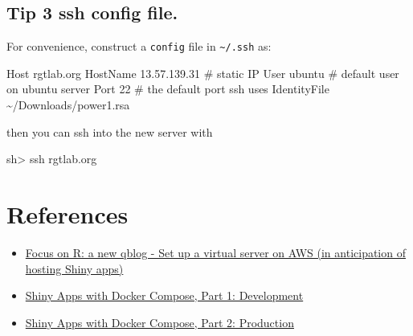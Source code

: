 \documentclass[
  letterpaper,
  DIV=11,
  numbers=noendperiod,
  oneside]{scrartcl}
\newenvironment{Shaded}{\begin{snugshade}}{\end{snugshade}}
\newcommand{\AttributeTok}[1]{\textcolor[rgb]{0.40,0.45,0.13}{#1}}
\newcommand{\CommentTok}[1]{\textcolor[rgb]{0.37,0.37,0.37}{#1}}
\newcommand{\ExtensionTok}[1]{\textcolor[rgb]{0.00,0.23,0.31}{#1}}
\newcommand{\FunctionTok}[1]{\textcolor[rgb]{0.28,0.35,0.67}{#1}}
\newcommand{\NormalTok}[1]{\textcolor[rgb]{0.00,0.23,0.31}{#1}}
\newcommand{\OperatorTok}[1]{\textcolor[rgb]{0.37,0.37,0.37}{#1}}
\newcommand{\VariableTok}[1]{\textcolor[rgb]{0.07,0.07,0.07}{#1}}
\providecommand{\tightlist}{%
  \setlength{\itemsep}{0pt}\setlength{\parskip}{0pt}}\usepackage{longtable,booktabs,array}
\begin{document}
\begin{Shaded}
\end{Shaded}

\hypertarget{tip-3-ssh-config-file.}{%
\subsection{Tip 3 ssh config file.}\label{tip-3-ssh-config-file.}}

For convenience, construct a \texttt{config} file in
\texttt{\textasciitilde{}/.ssh} as:

\begin{Shaded}
\begin{Highlighting}[]
\ExtensionTok{Host}\NormalTok{ rgtlab.org}
\ExtensionTok{HostName}\NormalTok{ 13.57.139.31 }\CommentTok{\# static IP}
\ExtensionTok{User}\NormalTok{ ubuntu }\CommentTok{\# default user on ubuntu server}
\ExtensionTok{Port}\NormalTok{ 22  }\CommentTok{\# the default port ssh uses}
\ExtensionTok{IdentityFile}\NormalTok{ \textasciitilde{}/Downloads/power1.rsa}
\end{Highlighting}
\end{Shaded}

then you can ssh into the new server with

\begin{Shaded}
\begin{Highlighting}[]
\FunctionTok{sh}\OperatorTok{\textgreater{}}\NormalTok{ ssh rgtlab.org }
\end{Highlighting}
\end{Shaded}

\hypertarget{references}{%
\section{References}\label{references}}

\begin{itemize}
\tightlist
\item
  \href{https://focusonr.org/posts/setupaws/}{Focus on R: a new qblog -
  Set up a virtual server on AWS (in anticipation of hosting Shiny
  apps)}
\item
  \href{https://hosting.analythium.io/shiny-apps-with-docker-compose-part-1-development/}{Shiny
  Apps with Docker Compose, Part 1: Development}
\item
  \href{https://hosting.analythium.io/shiny-apps-with-docker-compose-part-2-production/}{Shiny
  Apps with Docker Compose, Part 2: Production}
\end{itemize}
\end{document}

